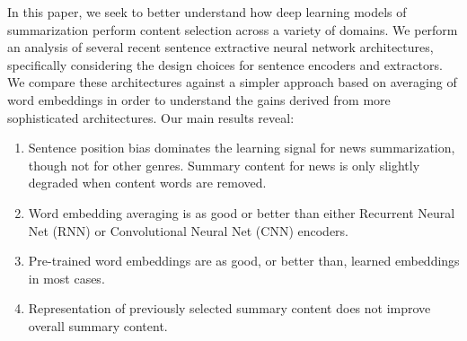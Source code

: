 In this paper, we seek to better understand how deep learning models of 
summarization perform content selection across a variety of domains.
We perform an analysis 
of several recent sentence extractive neural network architectures, 
specifically considering the design choices for sentence encoders and 
extractors. We compare these architectures against
a simpler approach based on averaging of word embeddings in order to understand
the gains derived from more sophisticated architectures.
%
%
%
Our main results reveal:
\begin{enumerate}
\item Sentence position bias dominates the learning signal for news summarization, though not for
other genres. Summary content for news is only slightly degraded when content words
are removed. 
\item Word embedding averaging is as good or better than either Recurrent Neural Net (RNN) or Convolutional Neural Net (CNN) encoders.
\item Pre-trained word embeddings are as good, or better than, learned embeddings in most cases.
\item Representation of previously selected summary content does not improve overall summary content. 
\end{enumerate} 

%
%


